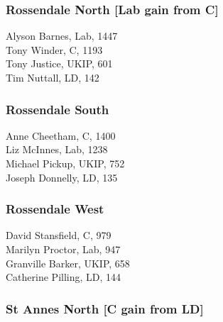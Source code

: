 \documentclass[a4paper,openany,10pt]{book}
\begin{document}
\subsubsection*{Rossendale North \hspace*{\fill}\nolinebreak[1]%
\enspace\hspace*{\fill}
[Lab gain from C]}



Alyson Barnes, Lab, 1447\\
Tony Winder, C, 1193\\
Tony Justice, UKIP, 601\\
Tim Nuttall, LD, 142\\


\subsubsection*{Rossendale South}



Anne Cheetham, C, 1400\\
Liz McInnes, Lab, 1238\\
Michael Pickup, UKIP, 752\\
Joseph Donnelly, LD, 135\\


\subsubsection*{Rossendale West}



David Stansfield, C, 979\\
Marilyn Proctor, Lab, 947\\
Granville Barker, UKIP, 658\\
Catherine Pilling, LD, 144\\


\subsubsection*{St Annes North \hspace*{\fill}\nolinebreak[1]%
\enspace\hspace*{\fill}
[C gain from LD]}

\end{document}
